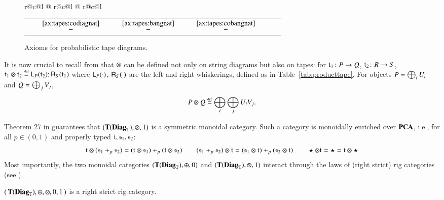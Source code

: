 \begin{figure}[t]
{\begin{tabular}{r@{\;}c@{\;}l @{\qquad} r@{\;}c@{\;}l @{\qquad} r@{\;}c@{\;}l}
{{\begin{tabular}{r@{\;}c@{\;}l @{\quad} r@{\;}c@{\;}l @{\quad} r@{\;}c@{\;}l @{\quad} r@{\;}c@{\;}l}
            &
            \mylabelbis{ax:tapes:codiagnat}{\ensuremath{\codiag{}\text{-nat}}}%
            \tikzfig{tapes/cipriano/monoidnatnewright} &$\stackrel{\eqref{ax:tapes:codiagnat}}{=}$& \tikzfig{tapes/cipriano/monoidnatnewleft}
            &
            \mylabelbis{ax:tapes:bangnat}{\ensuremath{\,\bangp{}\text{-nat}}}%
            \tikzfig{tapes/cipriano/bangnatleft} &$\stackrel{\eqref{ax:tapes:bangnat}}{=}$& \tikzfig{tapes/cipriano/bangnatright}
            &
            \mylabelbis{ax:tapes:cobangnat}{\ensuremath{\,\cobang{}\text{-nat}}}%
            \tikzfig{tapes/cipriano/cobangnatleft} &$\stackrel{\eqref{ax:tapes:cobangnat}}{=}$& \tikzfig{tapes/cipriano/cobangnatright}
        \end{tabular}
        }%
    }
\end{tabular}
}%
\caption{Axioms for probabilistic tape diagrams.}
\label{fig:tapesax}
\end{figure}
%
%



\medskip 
It is now crucial to recall from \cite{bonchi2025tapediagramsmonoidalmonads} that $\otimes$ can be defined not only on string diagrams but also on tapes: for $\mathfrak{t}_1 \colon P \to Q$, $\mathfrak{t}_2 \colon R \to S$,  $\mathfrak{t}_1 \otimes \mathfrak{t}_2 \stackrel{\text{\tiny def}}{=} \mathsf{L}_{P}({\mathfrak{t}_2}) ; \mathsf{R}_{S}({\mathfrak{t}_1}) $ where $\mathsf{L}_{P}({\cdot})$, $\mathsf{R}_{S}({\cdot})$ are the left and right whiskerings, defined as in Table~\ref{tab:producttape}. For objects $P = \Piu[i]{U_i}$ and $Q = \Piu[j]{V_j}$, 
\begin{equation}\label{def:productPolynomials} 
P \per Q \defeq \Piu[i]{\Piu[j]{U_iV_j}}\text{.}
\end{equation}

Theorem 27 in \cite{bonchi2025tapediagramsmonoidalmonads} guarantees that $(\mathbf{T}(\mathbf{Diag}_{\mathbb{T}}) ,\otimes, 1)$ is a symmetric monoidal category. Such a category is monoidally enriched over $\mathbf{PCA}$, i.e., for all $p\in(0,1)$ and properly typed $\mathfrak{t},\mathfrak{s}_1,\mathfrak{s}_2$:
\begin{equation}\label{eq:monoidalenrichment} \mathfrak{t} \otimes (\mathfrak{s}_1+_p \mathfrak{s}_2)= (\mathfrak{t} \otimes \mathfrak{s}_1)+_p(\mathfrak{t} \otimes \mathfrak{s}_2) \qquad  (\mathfrak{s}_1+_p \mathfrak{s}_2)  \otimes \mathfrak{t}= ( \mathfrak{s}_1 \otimes \mathfrak{t} )+_p(\mathfrak{s}_2 \otimes  \mathfrak{t}) \qquad \star \otimes \mathfrak{t}= \star = \mathfrak{t}\otimes \star \end{equation}
 Most importantly, the two monoidal categories $(\mathbf{T}(\mathbf{Diag}_{\mathbb{T}}), \oplus, 0)$ and $(\mathbf{T}(\mathbf{Diag}_{\mathbb{T}}), \otimes, 1)$ interact through the laws of (right strict) rig categories (see \cite{laplaza_coherence_1972,johnson2021bimonoidal}).

\begin{theorem}
$(\,\mathbf{T}(\mathbf{Diag}_{\mathbb{T}}), \oplus, \otimes, 0, 1 \,)$ is a right strict rig category.
\end{theorem}

